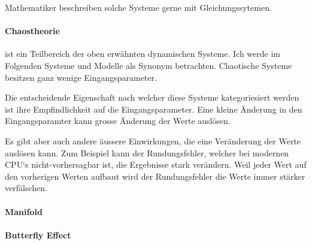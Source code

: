 \documentclass[chaostheorie/chaostheorie.tex]{subfiles}
\begin{document}
	Mathematiker beschreiben solche Systeme gerne mit Gleichungssytemen.
	
	\paragraph{Chaostheorie} ist ein Teilbereich der oben erwähnten dynamischen Systeme. Ich werde im Folgenden Systeme und Modelle als Synonym betrachten. Chaotische Systeme besitzen ganz wenige Eingangsparameter.
	
	Die entscheidende Eigenschaft nach welcher diese Systeme kategoriesiert werden ist ihre Empfindlichkeit auf die Eingangsparameter. Eine kleine Änderung in den Eingangsparamter kann grosse Änderung der Werte auslösen.
	
	Es gibt aber auch andere äussere Einwirkungen, die eine Veränderung der Werte auslösen kann. Zum Beispiel kann der Rundungsfehler, welcher bei modernen CPU‘s nicht-vorhersagbar ist, die Ergebnisse stark verändern. Weil jeder Wert auf den vorherigen Werten aufbaut wird der Rundungsfehler die Werte immer stärker verfälschen.
	
	\paragraph{Manifold}
	
	\paragraph{Butterfly Effect}
	
\end{document}
